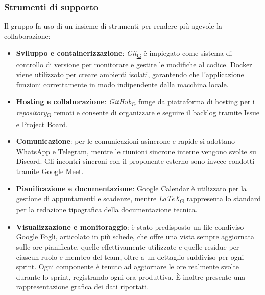 \documentclass[a4paper,12pt]{article}
\begin{document}
        \subsubsection{Strumenti di supporto}
            Il gruppo fa uso di un insieme di strumenti per rendere più agevole la collaborazione:
            \begin{itemize}
                \item \textbf{Sviluppo e containerizzazione}: \textit{Git}\textsubscript{\href{https://atlasteam9.github.io/Atlas/glossario.html\#Git}{G}} è impiegato come sistema di controllo di versione per monitorare e gestire le modifiche al codice. Docker viene utilizzato per creare ambienti isolati, garantendo che l'applicazione funzioni correttamente in modo indipendente dalla macchina locale.
                \item \textbf{Hosting e collaborazione}: \textit{GitHub}\textsubscript{\href{https://atlasteam9.github.io/Atlas/glossario.html\#GitHub}{G}} funge da piattaforma di hosting per i \textit{repository}\textsubscript{\href{https://atlasteam9.github.io/Atlas/glossario.html\#Repository}{G}} remoti e consente di organizzare e seguire il backlog tramite Issue e Project Board.
                \item \textbf{Comunicazione}: per le comunicazioni asincrone e rapide si adottano WhatsApp e Telegram, mentre le riunioni sincrone interne vengono svolte su Discord. Gli incontri sincroni con il proponente esterno sono invece condotti tramite Google Meet.
                \item \textbf{Pianificazione e documentazione}: Google Calendar è utilizzato per la gestione di appuntamenti e scadenze, mentre \textit{LaTeX}\textsubscript{\href{https://atlasteam9.github.io/Atlas/glossario.html\#LaTeX}{G}} rappresenta lo standard per la redazione tipografica della documentazione tecnica.
                \item \textbf{Visualizzazione e monitoraggio}: è stato predisposto un file condiviso Google Fogli, articolato in più schede, che offre una vista sempre aggiornata sulle ore pianificate, quelle effettivamente utilizzate e quelle residue per ciascun ruolo e membro del team, oltre a un dettaglio suddiviso per ogni sprint. Ogni componente è tenuto ad aggiornare le ore realmente svolte durante lo sprint, registrando ogni ora produttiva. È inoltre presente una rappresentazione grafica dei dati riportati.
            \end{itemize}
            
\end{document}
